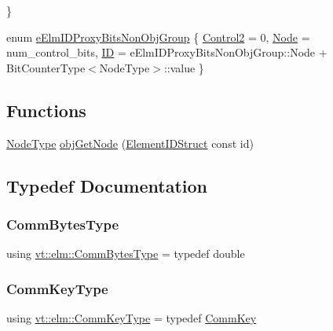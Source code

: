 \begin{DoxyCompactItemize}
 \}
\item 
enum \hyperlink{namespacevt_1_1elm_aecc441d9d3dee46f8a528484bdc8350c}{e\+Elm\+I\+D\+Proxy\+Bits\+Non\+Obj\+Group} \{ \hyperlink{namespacevt_1_1elm_aecc441d9d3dee46f8a528484bdc8350ca696c15ff7ed17fa970067d9dca66b102}{Control2} = 0, 
\hyperlink{namespacevt_1_1elm_aecc441d9d3dee46f8a528484bdc8350caae4fc8e251f731b9f5a37984bfc9ff76}{Node} = num\+\_\+control\+\_\+bits, 
\hyperlink{namespacevt_1_1elm_aecc441d9d3dee46f8a528484bdc8350cafd8d9b0132f88f78cfb1b1657da8b7cd}{ID} = e\+Elm\+I\+D\+Proxy\+Bits\+Non\+Obj\+Group\+:\+:Node + Bit\+Counter\+Type$<$Node\+Type$>$\+:\+:value
 \}
\end{DoxyCompactItemize}
\subsection*{Functions}
\begin{DoxyCompactItemize}
\item 
\hyperlink{namespacevt_a866da9d0efc19c0a1ce79e9e492f47e2}{Node\+Type} \hyperlink{namespacevt_1_1elm_a9a9321d5808282660d74aeb650d54084}{obj\+Get\+Node} (\hyperlink{structvt_1_1elm_1_1_element_i_d_struct}{Element\+I\+D\+Struct} const id)
\end{DoxyCompactItemize}


\subsection{Typedef Documentation}
\mbox{\label{namespacevt_1_1elm_a6005d029f0531d2809076ce7186416bf}} 
\subsubsection{\texorpdfstring{Comm\+Bytes\+Type}{CommBytesType}}
{\footnotesize\ttfamily using \hyperlink{namespacevt_1_1elm_a6005d029f0531d2809076ce7186416bf}{vt\+::elm\+::\+Comm\+Bytes\+Type} = typedef double}

\mbox{\label{namespacevt_1_1elm_a89067ebf8407548591583dd2f60b53b5}} 
\subsubsection{\texorpdfstring{Comm\+Key\+Type}{CommKeyType}}
{\footnotesize\ttfamily using \hyperlink{namespacevt_1_1elm_a89067ebf8407548591583dd2f60b53b5}{vt\+::elm\+::\+Comm\+Key\+Type} = typedef \hyperlink{structvt_1_1elm_1_1_comm_key}{Comm\+Key}}

